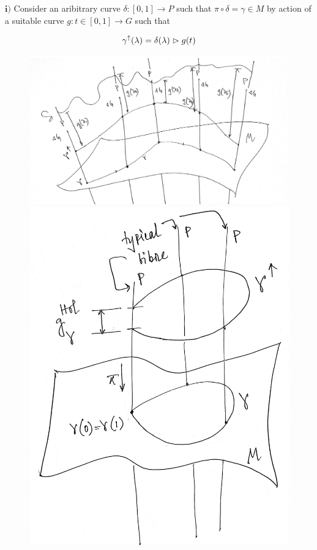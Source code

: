 \documentclass[8pt, twocoloumn]{article}
\begin{document}
$\textbf{i)}$ Consider an aribitrary curve $\delta: [0,1] \to P$ such that $\pi \circ \delta = \gamma \in M$ by action of a suitable curve $g: t \in [0,1] \to G$ such that 

\begin{align}{\label{arbitrarycurvetransport}}
\gamma^{\uparrow}(\lambda) = \delta(\lambda) \vartriangleright g(t)
\end{align}

\begin{figure}[h!]{\label{fig: hdhfjfdihfhdf}}
\begin{center}
\includegraphics[scale = 0.15]{horizontallift.jpg} 
\hspace{0.3in}
\includegraphics[scale = 0.1]{holonomy.jpg}

\end{center}
\end{figure}
\end{document}
